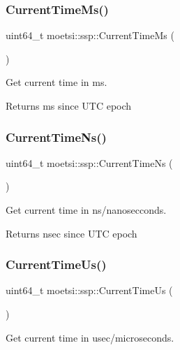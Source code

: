 \subsubsection{\texorpdfstring{Current\+Time\+Ms()}{CurrentTimeMs()}}
{\footnotesize\ttfamily uint64\+\_\+t moetsi\+::ssp\+::\+Current\+Time\+Ms (\begin{DoxyParamCaption}{ }\end{DoxyParamCaption})}



Get current time in ms. 

\begin{DoxyReturn}{Returns}
ms since U\+TC epoch 
\end{DoxyReturn}
\mbox{\label{namespacemoetsi_1_1ssp_ae09a8f6b1d89b0bdb6eec602dd581192}} 
\subsubsection{\texorpdfstring{Current\+Time\+Ns()}{CurrentTimeNs()}}
{\footnotesize\ttfamily uint64\+\_\+t moetsi\+::ssp\+::\+Current\+Time\+Ns (\begin{DoxyParamCaption}{ }\end{DoxyParamCaption})}



Get current time in ns/nanosecconds. 

\begin{DoxyReturn}{Returns}
nsec since U\+TC epoch 
\end{DoxyReturn}
\mbox{\label{namespacemoetsi_1_1ssp_ad7107897c233642c927f0129f2aea2e0}} 
\subsubsection{\texorpdfstring{Current\+Time\+Us()}{CurrentTimeUs()}}
{\footnotesize\ttfamily uint64\+\_\+t moetsi\+::ssp\+::\+Current\+Time\+Us (\begin{DoxyParamCaption}{ }\end{DoxyParamCaption})}



Get current time in usec/microseconds. 

